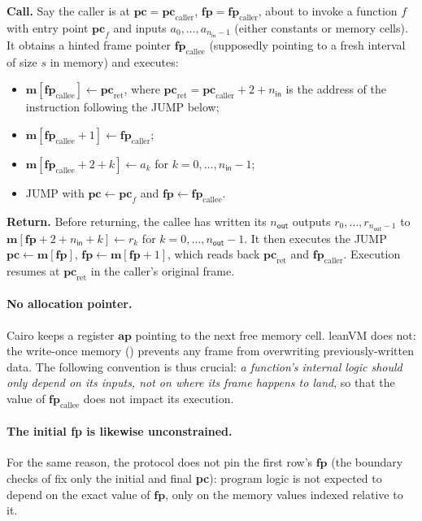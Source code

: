 \documentclass{article}
\theoremstyle{definition}
\begin{document}
\textbf{Call.} Say the caller is at $\textbf{pc} = \textbf{pc}_\text{caller}$, $\textbf{fp} = \textbf{fp}_\text{caller}$, about to invoke a function $f$ with entry point $\textbf{pc}_f$ and inputs $a_0, \dots, a_{n_\textsf{in}-1}$ (either constants or memory cells). It obtains a hinted frame pointer $\textbf{fp}_\text{callee}$ (supposedly pointing to a fresh interval of size $s$ in memory) and executes:
\begin{itemize}
    \item $\textbf{m}[\textbf{fp}_\text{callee}] \gets \textbf{pc}_\text{ret}$, where $\textbf{pc}_\text{ret}  = \textbf{pc}_\text{caller} + 2 + n_\textsf{in}$ is the address of the instruction following the JUMP below;
    \item $\textbf{m}[\textbf{fp}_\text{callee} + 1] \gets \textbf{fp}_\text{caller}$;
    \item $\textbf{m}[\textbf{fp}_\text{callee} + 2 + k] \gets a_k$ for $k = 0, \dots, n_\textsf{in} - 1$;
    \item JUMP with $\textbf{pc} \gets \textbf{pc}_f$ and $\textbf{fp} \gets \textbf{fp}_\text{callee}$.
\end{itemize}

\textbf{Return.} Before returning, the callee has written its $n_\textsf{out}$ outputs $r_0, \dots, r_{n_\textsf{out}-1}$ to $\textbf{m}[\textbf{fp} + 2 + n_\textsf{in} + k] \gets r_k$ for $k = 0, \dots, n_\textsf{out} - 1$. It then executes the JUMP $\textbf{pc} \gets \textbf{m}[\textbf{fp}]$, $\textbf{fp} \gets \textbf{m}[\textbf{fp} + 1]$, which reads back $\textbf{pc}_\text{ret}$ and $\textbf{fp}_\text{caller}$. Execution resumes at $\textbf{pc}_\text{ret}$ in the caller's original frame.

\paragraph{No allocation pointer.} Cairo \cite{cairo} keeps a register $\textbf{ap}$ pointing to the next free memory cell. leanVM does not: the write-once memory () prevents any frame from overwriting previously-written data. The following convention is thus crucial: \textit{a function's internal logic should only depend on its inputs, not on where its frame happens to land}, so that the value of $\textbf{fp}_\text{callee}$ does not impact its execution.

\paragraph{The initial fp is likewise unconstrained.} For the same reason, the protocol does not pin the first row's $\textbf{fp}$ (the boundary checks of  fix only the initial and final \textbf{pc}): program logic is not expected to depend on the exact value of $\textbf{fp}$, only on the memory values indexed relative to it.
\end{document}
